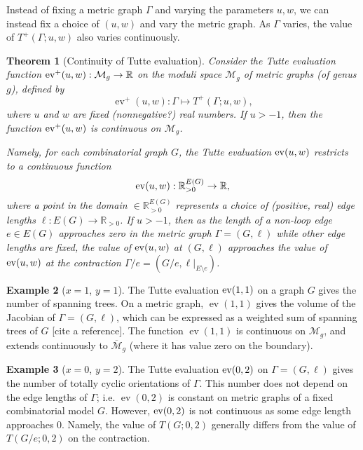 \documentclass{amsart}
\newtheorem{thm}{Theorem}
\theoremstyle{definition}
\newtheorem{eg}[thm]{Example}
\newcommand{\RR}{\mathbb{R}}
\DeclareMathOperator{\ev}{ev}
\begin{document}
Instead of fixing a metric graph $\Gamma$ and varying the parameters $u,w$,
we can instead fix a choice of $(u,w)$ and vary the metric graph.
As $\Gamma$ varies, the value of $T^+(\Gamma;u,w)$ also varies continuously.
\begin{thm}[Continuity of Tutte evaluation]
\label{thm:tutte-eval-moduli}
Consider the Tutte evaluation function %
${\rm ev}^+(u,w) : \mathcal M_g \to \RR$ 
on the moduli space 
$\mathcal M_g$ of metric graphs (of genus $g$),
defined by
$$ \ev^+(u,w) : \Gamma \mapsto T^+(\Gamma; u,w) ,$$
where  $u$ and $w$ are fixed (nonnegative?) real numbers.
If $u > -1$, 
then the function ${\rm ev}^+(u,w)$ is continuous on $\mathcal M_g$.

Namely, for each combinatorial graph $G$,
the Tutte evaluation 
${\rm ev}(u,w) $ 
restricts to a continuous function
$$ {\rm ev}(u,w) : \RR_{>0}^{E(G)} \to \RR,$$ 
where a point in the domain $ \in \RR_{>0}^{E(G)}$
represents a choice of (positive, real) edge lengths  $\ell : E(G) \to \RR_{>0}$.
If $u > -1$, then as the length of a  non-loop edge $e \in E(G)$ approaches zero
in the metric graph $\Gamma = (G,\ell)$
while other edge lengths are fixed,
the value of 
${\rm ev}(u,w)$
at $(G,\ell)$ %
approaches the value of ${\rm ev}(u,w)$ at the contraction 
$\Gamma / e = (G / e, \ell \big|_{E\setminus e})$.
\end{thm}

\begin{eg}
[$x = 1$, $y=1$]
The Tutte evaluation ${\rm ev}(1,1)$ 
on a graph $G$ gives the number of spanning trees.
On a metric graph, $\ev(1,1)$ gives the volume of the Jacobian of
$\Gamma = (G,\ell)$,
which can be expressed as a weighted sum of spanning trees of $G$ [cite a reference].
The function $\ev(1,1)$ is continuous on $\mathcal M_g$, 
and extends continuously to $\overline{\mathcal M}_g$ 
(where it has value zero on the boundary).
\end{eg}
\begin{eg}
[$x = 0$, $y=2$]
The Tutte evaluation ${\rm ev}(0,2)$ 
on $\Gamma = (G,\ell)$ gives the number of totally cyclic orientations of $\Gamma$.
This number does not depend on the edge lengths of $\Gamma$;
i.e. $\ev(0,2)$
 is constant on metric graphs %
of a fixed combinatorial model $G$.
However, ${\rm ev}(0,2)$ is not continuous as some edge length approaches $0$.
Namely, the value of $T(G; 0, 2)$ generally differs from the value of $T(G/e; 0,2)$
on the contraction.
\end{eg}
\end{document}
